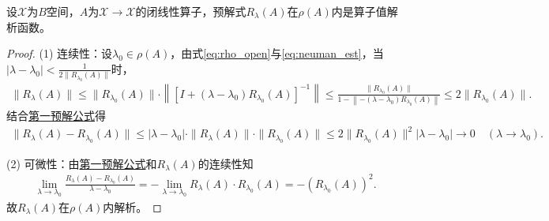 \documentclass[../../main.tex]{subfiles}%
\begin{document}
\begin{theorem}\label{theorem:预解式都在预解集上是解析的}
设$\mathscr{X}$为$B$空间，$A$为$\mathscr{X}\to \mathscr{X}$的闭线性算子，预解式$R_{\lambda}(A)$在$\rho(A)$内是算子值解析函数。
\end{theorem}
\begin{proof}
(1) 连续性：设$\lambda_0\in\rho(A)$，由式\eqref{eq:rho_open}与\eqref{eq:neuman_est}，当$|\lambda-\lambda_0|<\frac{1}{2\|R_{\lambda_0}(A)\|}$时，
\begin{align*}
\parallel R_{\lambda}(A)\parallel \leqslant \parallel R_{\lambda _0}(A)\parallel \cdot \left\| \left[ I+(\lambda -\lambda _0)R_{\lambda _0}(A) \right] ^{-1} \right\| \leqslant \frac{\parallel R_{\lambda _0}(A)\parallel}{1-\left\| -(\lambda -\lambda _0)R_{\lambda _0}(A) \right\|}\leqslant 2\parallel R_{\lambda _0}(A)\parallel .
\end{align*}
结合\hyperref[lemma:第一预解公式]{第一预解公式}得
\begin{align*}
\|R_{\lambda}(A)-R_{\lambda_0}(A)\|\leqslant|\lambda-\lambda_0|\cdot\|R_{\lambda}(A)\|\cdot\|R_{\lambda_0}(A)\|
\leqslant2\|R_{\lambda_0}(A)\|^2|\lambda-\lambda_0|\to0\quad(\lambda\to\lambda_0).
\end{align*}

(2) 可微性：由\hyperref[lemma:第一预解公式]{第一预解公式}和$R_\lambda(A)$的连续性知
\begin{align*}
\lim\limits_{\lambda\to\lambda_0}\frac{R_{\lambda}(A)-R_{\lambda_0}(A)}{\lambda-\lambda_0}=-\lim\limits_{\lambda\to\lambda_0}R_{\lambda}(A)\cdot R_{\lambda_0}(A)=-\left(R_{\lambda_0}(A)\right)^2.
\end{align*}
故$R_{\lambda}(A)$在$\rho(A)$内解析。
\end{proof}
\end{document}
